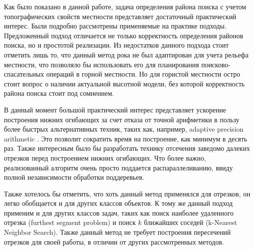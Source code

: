 \startconclusionpage

Как было показано в данной работе, задача определения района поиска
с учетом топографических свойств местности представляет
достаточный практический интерес. Были подробно рассмотрены применяемые
на практике подходы. Предложенный подход отличается не только
корректность определения районов поиска, но и простотой реализации.
Из недостатков данного подхода стоит отметить лишь то, что данный метод
рока не был адаптирован для учета рельефа местности, что позволяло бы
использовать его для планирования поисково-спасательных операций в горной
местности. Но для гористой местности остро стоит вопрос о наличии актуальной
высотной модели, без которой корректность района поиска стоит под сомнением.

В данный момент большой практический интерес представляет ускорение
построения нижних огибающих за счет отказа от точной арифметики в пользу более
быстрых альтернативных техник, таких как, например, adaptive precision
arithmetic \cite{APREC}. Это позволит сократить время на построение, как минимум в
десять раз. Также интересным было бы разработать технику отсечения
заведомо далеких отрезков перед построением нижних огибающих. Что более
важно, реализованный алгоритм очень просто поддается распараллеливанию,
ввиду полной независимости обработки поддеревьев.

Также хотелось бы отметить, что хоть данный метод применялся для
отрезков, он легко обобщается и для других классов объектов. К тому же
данный подход применим и для других классов задач, таких как поиск наиболее
удаленного отрезка (furthest segment problem) и поиск $k$ ближайших соседей
(k-Nearest Neighbor Search). Также данный метод не требует построения
пересечений отрезков для своей работы, в отличии от других рассмотренных
методов.

\FloatBarrier
